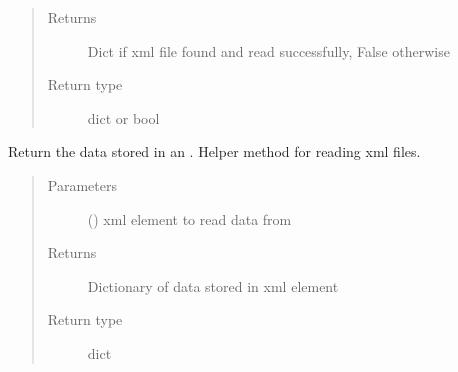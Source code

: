 \documentclass[letterpaper,10pt,english]{sphinxmanual}
\begin{document}
\begin{fulllineitems}
\begin{fulllineitems}
\begin{quote}
\begin{description}
\item[{Returns}] \leavevmode
Dict if xml file found and read successfully, False otherwise

\item[{Return type}] \leavevmode
dict or bool

\end{description}\end{quote}

\end{fulllineitems}


\begin{fulllineitems}
\label{\detokenize{polo.utils:polo.utils.io_utils.XmlReader.get_data_from_xml_element}}
Return the data stored in an . Helper method
for reading xml files.
\begin{quote}\begin{description}
\item[{Parameters}] \leavevmode
{} (\sphinxstyleliteralemphasis{\sphinxupquote{{[}}}\sphinxstyleliteralemphasis{\sphinxupquote{{]}}}) \textendash{} xml element to read data from

\item[{Returns}] \leavevmode
Dictionary of data stored in xml element

\item[{Return type}] \leavevmode
dict

\end{description}\end{quote}

\end{fulllineitems}


\begin{fulllineitems}
\label{\detokenize{polo.utils:polo.utils.io_utils.XmlReader.platedef_key}}
\end{fulllineitems}


\end{fulllineitems}
\end{document}
